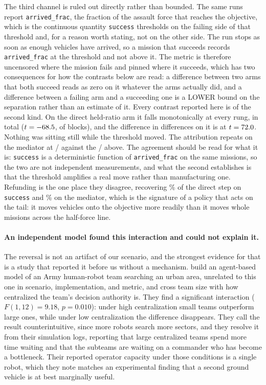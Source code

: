 \documentclass[11pt]{article}
\begin{document}
The third channel is ruled out directly rather than bounded. The same runs report \texttt{arrived\_frac}, the fraction of the assault force that reaches the objective, which is the continuous quantity \texttt{success} thresholds on the failing side of that threshold and, for a reason worth stating, not on the other side. The run stops as soon as enough vehicles have arrived, so a mission that succeeds records \texttt{arrived\_frac} at the threshold and not above it. The metric is therefore uncensored where the mission fails and pinned where it succeeds, which has two consequences for how the contrasts below are read: a difference between two arms that both succeed reads as zero on it whatever the arms actually did, and a difference between a failing arm and a succeeding one is a LOWER bound on the separation rather than an estimate of it. Every contrast reported here is of the second kind. On the direct held-ratio arm it falls monotonically at every rung, \atArrHeldDir{} in total ($t = -68.5$, \atArrBlocks{} of \atArrBlocksN{} blocks), and the difference in differences on it is \atArrDid{} at $t = 72.0$. Nothing was sitting still while the threshold moved. The attribution repeats on the mediator at \atArrConsoleShare/\atArrScenarioShare{} against the \atConsoleShare/\atScenarioShare{} above. The agreement should be read for what it is: \texttt{success} is a deterministic function of \texttt{arrived\_frac} on the same missions, so the two are not independent measurements, and what the second establishes is that the threshold amplifies a real move rather than manufacturing one. Refunding is the one place they disagree, recovering \atRefundShare\% of the direct step on \texttt{success} and \atArrRefundShare\% on the mediator, which is the signature of a policy that acts on the tail: it moves vehicles onto the objective more readily than it moves whole missions across the half-force line.

\paragraph{An independent model found this interaction and could not explain it.} The reversal is not an artifact of our scenario, and the strongest evidence for that is a study that reported it before us without a mechanism. \citet{giachetti2012agent} build an agent-based model of an Army human-robot team searching an urban area, unrelated to this one in scenario, implementation, and metric, and cross team size with how centralized the team's decision authority is. They find a significant interaction ($F(1,12) = 9.18$, $p = 0.010$): under high centralization small teams outperform large ones, while under low centralization the difference disappears. They call the result counterintuitive, since more robots search more sectors, and they resolve it from their simulation logs, reporting that large centralized teams spend more time waiting and that the subteams are waiting on a commander who has become a bottleneck. Their reported operator capacity under those conditions is a single robot, which they note matches an experimental finding that a second ground vehicle is at best marginally useful.
\end{document}
